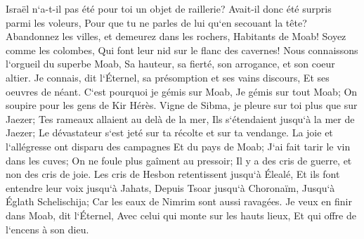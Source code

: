 \verse Israël n`a-t-il pas été pour toi un objet de raillerie? Avait-il donc été surpris parmi les voleurs, Pour que tu ne parles de lui qu`en secouant la tête? 
\verse Abandonnez les villes, et demeurez dans les rochers, Habitants de Moab! Soyez comme les colombes, Qui font leur nid sur le flanc des cavernes! 
\verse Nous connaissons l`orgueil du superbe Moab, Sa hauteur, sa fierté, son arrogance, et son coeur altier. 
\verse Je connais, dit l`Éternel, sa présomption et ses vains discours, Et ses oeuvres de néant. 
\verse C`est pourquoi je gémis sur Moab, Je gémis sur tout Moab; On soupire pour les gens de Kir Hérès. 
\verse Vigne de Sibma, je pleure sur toi plus que sur Jaezer; Tes rameaux allaient au delà de la mer, Ils s`étendaient jusqu`à la mer de Jaezer; Le dévastateur s`est jeté sur ta récolte et sur ta vendange. 
\verse La joie et l`allégresse ont disparu des campagnes Et du pays de Moab; J`ai fait tarir le vin dans les cuves; On ne foule plus gaîment au pressoir; Il y a des cris de guerre, et non des cris de joie. 
\verse Les cris de Hesbon retentissent jusqu`à Élealé, Et ils font entendre leur voix jusqu`à Jahats, Depuis Tsoar jusqu`à Choronaïm, Jusqu`à Églath Schelischija; Car les eaux de Nimrim sont aussi ravagées. 
\verse Je veux en finir dans Moab, dit l`Éternel, Avec celui qui monte sur les hauts lieux, Et qui offre de l`encens à son dieu. 
